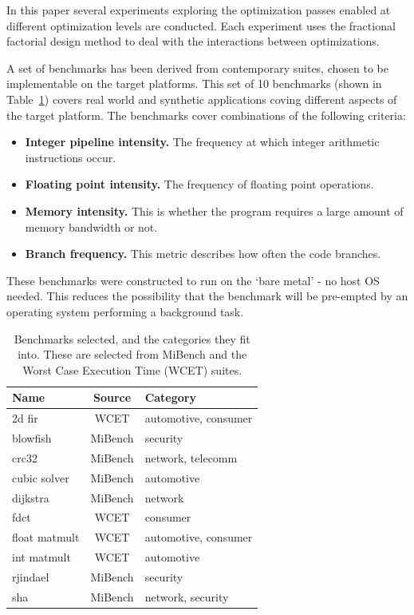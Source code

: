 \documentclass[twocolumn]{article}
\let\oldcaption\caption
\renewcommand{\caption}[1]{\oldcaption{\textup{#1}}}
\begin{document}
In this paper several experiments exploring the optimization passes enabled at different optimization levels are conducted. Each experiment uses the fractional factorial design method to deal with the interactions between optimizations.


A set of benchmarks has been derived from contemporary suites, chosen to be implementable on the target platforms. This set of 10 benchmarks (shown in Table~\ref{Table:Benchmarks}) covers real world and synthetic applications coving different aspects of the target platform. The benchmarks cover combinations of the following criteria:
\begin{itemize}
	\setlength{\itemsep}{0em}
	\vspace{-1mm}
	\item \textbf{Integer pipeline intensity.} The frequency at which integer arithmetic instructions occur.
	\item \textbf{Floating point intensity.} The frequency of floating point operations.
	\item \textbf{Memory intensity.} This is whether the program requires a large amount of memory bandwidth or not.
	\item \textbf{Branch frequency.} This metric describes how often the code branches.
\end{itemize}

These benchmarks were constructed to run on the `bare metal' - no host OS needed. This reduces the possibility that the benchmark will be pre-empted by an operating system performing a background task.

\begin{table}[t]
	\centering
	\begin{tabular}{l c l}
	\textbf{Name}			& \textbf{Source} 	& \textbf{Category} \\
	\hline
	2d fir					& WCET 		& automotive, consumer	\\
	blowfish				& MiBench 	& security	\\
	crc32					& MiBench 	& network, telecomm	\\
	cubic solver			& MiBench 	& automotive	\\
	dijkstra				& MiBench 	& network	\\
	fdct					& WCET 		& consumer	\\
	float matmult			& WCET 		& automotive, consumer	\\
	int matmult				& WCET	 	& automotive	\\
	rjindael				& MiBench 	& security	\\
	sha						& MiBench 	& network, security	\\
	\end{tabular}
\caption{Benchmarks selected, and the categories they fit into. These are selected from MiBench\cite{MiBench} and the Worst Case Execution Time (WCET)\cite{WCET} suites.}
\label{Table:Benchmarks}
\end{table}
\end{document}

